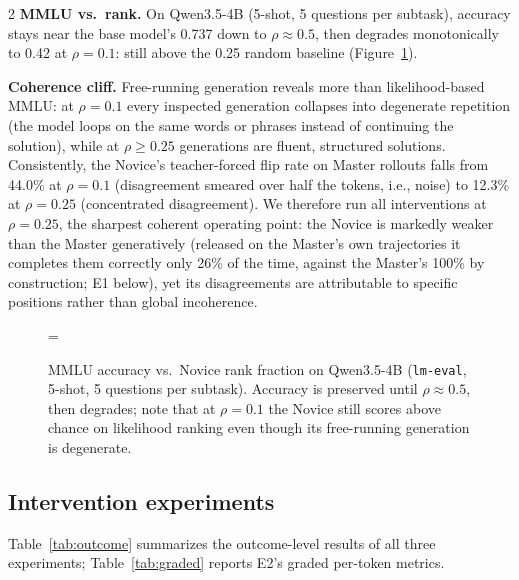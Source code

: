 \documentclass[9pt]{article}
\newcommand{\inputpgf}[1]{%
  \begingroup
  \def\mathdefault##1{##1}%
  \everymath=\expandafter{\the\everymath\displaystyle}%
  \fontsize{8}{9.6}\selectfont
  \endgroup
}
\begin{document}
\begin{multicols}{2}
\textbf{MMLU vs.\ rank.} On Qwen3.5-4B (5-shot, 5 questions per subtask),
accuracy stays near the base model's 0.737 down to $\rho \approx 0.5$, then
degrades monotonically to 0.42 at $\rho{=}0.1$: still above the 0.25 random
baseline (Figure~\ref{fig:mmlu}).

\textbf{Coherence cliff.} Free-running generation reveals more than
likelihood-based MMLU: at $\rho{=}0.1$ every inspected generation collapses
into degenerate repetition (the model loops on the same words or phrases
instead of continuing the solution), while at $\rho \geq 0.25$ generations
are fluent, structured solutions. Consistently, the Novice's teacher-forced flip rate on
Master rollouts falls from 44.0\% at $\rho{=}0.1$ (disagreement smeared over
half the tokens, i.e., noise) to 12.3\% at $\rho{=}0.25$ (concentrated
disagreement). We therefore run all interventions at $\rho{=}0.25$, the
sharpest coherent operating point: the Novice is markedly weaker than the
Master generatively (released on the Master's own trajectories it completes
them correctly only 26\% of the time, against the Master's 100\% by
construction; E1 below), yet its disagreements are attributable to specific
positions rather than global incoherence.

\begin{figure}[H]
  \centering
  \inputpgf{figures/mmlu_rank_sweep.pgf}
  \caption{MMLU accuracy vs.\ Novice rank fraction on Qwen3.5-4B
    (\texttt{lm-eval}, 5-shot, 5 questions per subtask). Accuracy is preserved
    until $\rho \approx 0.5$, then degrades; note that at $\rho{=}0.1$ the
    Novice still scores above chance on likelihood ranking even though its
    free-running generation is degenerate.}
  \label{fig:mmlu}
\end{figure}

\subsection{Intervention experiments}\label{sec:intervention-results}

Table~\ref{tab:outcome} summarizes the outcome-level results of all three
experiments; Table~\ref{tab:graded} reports E2's graded per-token metrics.


\end{multicols}
\end{document}
